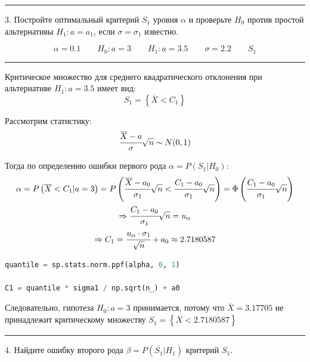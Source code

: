 \documentclass[a4paper, 14pt]{extarticle}
\begin{document}
\rule{\linewidth}{0.1mm}

3. Постройте оптимальный критерий $S_1$ уровня $\alpha$ и проверьте $H_0$ против простой 
альтернативы $H_1: a = a_1$, если $\sigma = \sigma_1$ известно.

\begin{equation*}
    \alpha = 0.1 \qquad H_{0}: a = 3 \qquad H_1: a = 3.5 \qquad \sigma = 2.2 \qquad S_1
\end{equation*}

\rule{\linewidth}{0.1mm}

Критическое множество для среднего квадратического отклонения при альтернативе $H_1: a = 3.5$ 
имеет вид:
\begin{equation*}
    S_1 = \left\{ \overline{X} < C_1 \right\}
\end{equation*}

Рассмотрим статистику:
\begin{equation*}
    \cfrac{\overline{X} - a}{\sigma}\sqrt{n} \sim N(0, 1)
\end{equation*}

Тогда по определению ошибки первого рода $\alpha = P(S_1|H_0)$:
\begin{gather*}
    \alpha = P\left(\overline{X} < C_1 | a = 3\right) = 
    P\left( \cfrac{\overline{X} - a_0}{\sigma_1} \sqrt{n} < 
    \cfrac{C_1 - a_0}{\sigma_1} \sqrt{n} \right)
    = \Phi\left(\cfrac{C_1 - a_0}{\sigma_1} \sqrt{n}\right) \\
    \Rightarrow \cfrac{C_1 - a_0}{\sigma_1} \sqrt{n} = u_\alpha \\
    \Rightarrow C_1 = \cfrac{u_\alpha \cdot \sigma_1}{\sqrt{n}} + a_0 \approx 2.7180587 
\end{gather*}

\begin{center}
    \begin{lstlisting}[language=Python]
quantile = sp.stats.norm.ppf(alpha, 0, 1)

C1 = quantile * sigma1 / np.sqrt(n_) + a0
    \end{lstlisting}
\end{center}

Следовательно, гипотеза $H_{0}: a = 3$ принимается, потому что $\overline{X} = 3.17705$ не 
принадлежит критическому множеству $S_1 = \left\{ \overline{X} < 2.7180587 \right\}$

\rule{\linewidth}{0.1mm}

4. Найдите ошибку второго рода $\beta = P(\overline{S_1} | H_1)$ критерий $S_1$.
\end{document}

